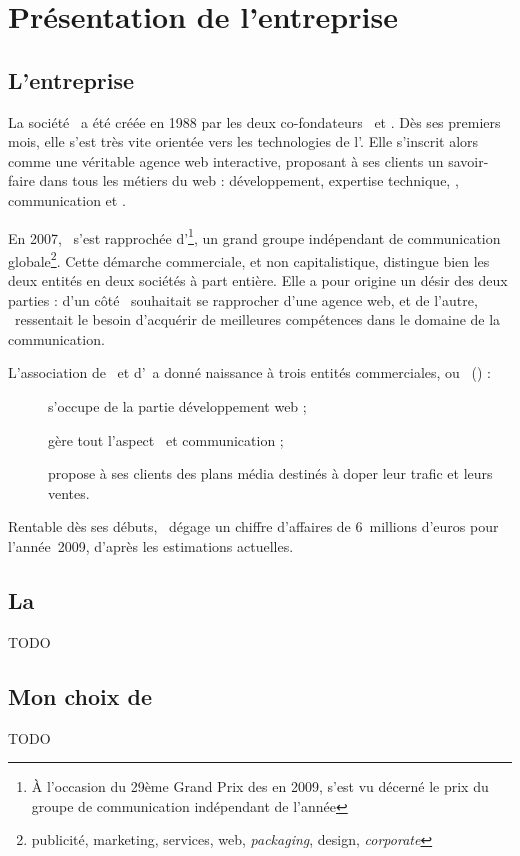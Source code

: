 \chapter{Présentation de l'entreprise}

\section{L'entreprise \asensio}

La société \asensio\ a été créée en 1988 par les deux co-fondateurs \apotencier\ et \apascal. Dès ses premiers mois, elle s'est très vite orientée vers les technologies de l'\ainternet. Elle s'inscrit alors comme une véritable agence web interactive, proposant à ses clients un savoir-faire dans tous les métiers du web : développement, expertise technique, \awm, communication et \awd.

En 2007, \asensio\ s'est rapprochée d'\aextreme\footnote{À l'occasion du 29ème Grand Prix des \aagencesannee en 2009, \aextreme s'est vu décerné le prix du groupe de communication indépendant de l'année}, un grand groupe indépendant de communication globale\footnote{publicité, marketing, services, web, \textit{packaging}, design, \textit{corporate}}. Cette démarche commerciale, et non capitalistique, distingue bien les deux entités en deux sociétés à part entière. Elle a pour origine un désir des deux parties : d'un côté \aextreme\ souhaitait se rapprocher d'une agence web, et de l'autre, \asensio\ ressentait le besoin d'acquérir de meilleures compétences dans le domaine de la communication.

L'association de \asensio\ et d'\aextreme\ a donné naissance à trois entités commerciales, ou \abusfull\ (\abus) :

\begin{description}
	\item[\asl] s'occupe de la partie développement web ;
	\item[\aes] gère tout l'aspect \awm\ et communication ;
	\item[\aesm] propose à ses clients des plans média destinés à doper leur trafic et leurs ventes. 
\end{description}

Rentable dès ses débuts, \asensio\ dégage un chiffre d'affaires de 6~millions d'euros pour l'année~2009, d'après les estimations actuelles.


\section{La \abu\ \asl}

TODO


\section{Mon choix de \asl}

TODO

